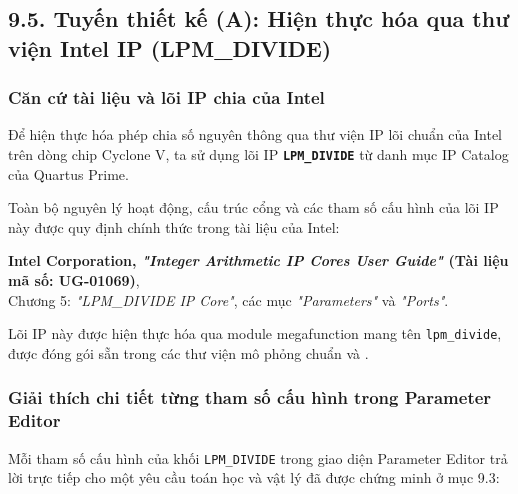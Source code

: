\subsection*{9.5. Tuyến thiết kế (A): Hiện thực hóa qua thư viện Intel IP (LPM\_DIVIDE)}

\subsubsection*{Căn cứ tài liệu và lõi IP chia của Intel}
Để hiện thực hóa phép chia số nguyên thông qua thư viện IP lõi chuẩn của Intel trên dòng chip Cyclone V, ta sử dụng lõi IP \textbf{\texttt{LPM\_DIVIDE}} từ danh mục IP Catalog của Quartus Prime. 

Toàn bộ nguyên lý hoạt động, cấu trúc cổng và các tham số cấu hình của lõi IP này được quy định chính thức trong tài liệu của Intel:
\begin{center}
\textbf{Intel Corporation, \emph{"Integer Arithmetic IP Cores User Guide"} (Tài liệu mã số: UG-01069)},\\
Chương 5: \emph{"LPM\_DIVIDE IP Core"}, các mục \emph{"Parameters"} và \emph{"Ports"}.
\end{center}

Lõi IP này được hiện thực hóa qua module megafunction mang tên \texttt{lpm\_divide}, được đóng gói sẵn trong các thư viện mô phỏng chuẩn  và .

\subsubsection*{Giải thích chi tiết từng tham số cấu hình trong Parameter Editor}
Mỗi tham số cấu hình của khối \texttt{LPM\_DIVIDE} trong giao diện Parameter Editor trả lời trực tiếp cho một yêu cầu toán học và vật lý đã được chứng minh ở mục 9.3:

